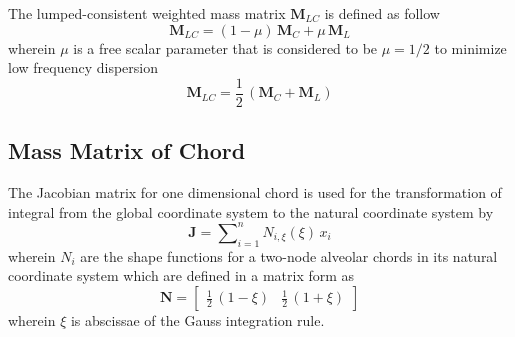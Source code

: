 The lumped-consistent weighted mass matrix $\mathbf{M}_{LC} $ is defined as follow
\begin{equation}
\mathbf{M}_{LC}  = (1 - \mu) \, \mathbf{M}_{C} + \mu \, \mathbf{M}_{L}
\end{equation}
wherein $\mu$ is a free scalar parameter that is considered to be $\mu = 1/2$ to minimize low frequency dispersion
\begin{equation}
\mathbf{M}_{LC}  = \frac{1}{2} \, (\mathbf{M}_{C} + \mathbf{M}_{L})
\label{LumconsMass}
\end{equation}

\subsection{Mass Matrix of Chord}
The Jacobian matrix for one dimensional chord is used for the transformation of integral from the global coordinate system to the natural coordinate system by
\begin{equation}
     \mathbf{J} = \sum\nolimits_{i=1}^n N_{i,\xi} (\xi) \, x_i
     \label{detJac1D}
\end{equation}
wherein $N_{i}$ are the shape functions for a two-node alveolar chords in its natural coordinate system which are defined in a matrix form as
\begin{equation}
	\mathbf{N} = \begin{bmatrix}
    \frac{1}{2} \, (1 - \xi) &  \frac{1}{2} \, (1 + \xi)
\end{bmatrix} 
\end{equation}
wherein $\xi$ is abscissae of the Gauss integration rule. 

